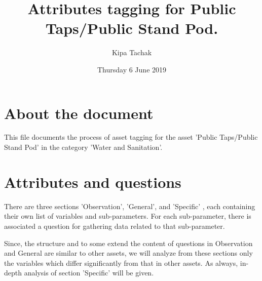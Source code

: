 \documentclass[oneside,twocolumn]{article}
\title{Attributes tagging for Public Taps/Public Stand Pod.}
\author{Kipa Tachak}
\date{Thursday  6 June 2019}
\begin{document}
\maketitle

\section{About the document}
This file documents the process of asset tagging for the asset
'Public Taps/Public Stand Pod' in the category 'Water and
Sanitation'.
\section{Attributes and questions}
There are three sections 'Observation', 'General', and 'Specific'
, each containing their own list of variables and sub-parameters.
For each sub-parameter, there is associated a question for
gathering data related to that sub-parameter.

Since, the structure and to some extend the content of questions
in Observation and General are similar to other assets, we will
analyze from these sections only the variables which differ
significantly from that in other assets. As always, in-depth analysis of section 'Specific' will be given.
\end{document}
